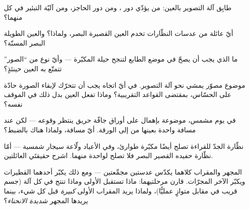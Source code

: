 \begin{exercise}[$\star$]\label{exo:g8:lenses-images:6}
طابِق آلة التصوير بالعين: من يؤدّي دور ، ومن دور
الحاجز، ومن آليّة التبئير في كل منهما؟
\end{exercise}

\begin{exercise}[$\star$]\label{exo:g8:lenses-images:7}
أيّ عائلة من عدسات النظّارات تخدم العين القصيرة البصر، ولماذا؟
والعين الطويلة البصر المسنّة؟
\end{exercise}

\begin{exercise}[$\star$]\label{exo:g8:lenses-images:8}
ما الذي يجب أن يصحّ في موضع الطابع لتنجح حيلة المكبّرة ---
وأيّ نوع من ``الصور'' تتمتّع به العين حينئذٍ؟
\end{exercise}

\begin{exercise}[$\star\star$]\label{exo:g8:lenses-images:9}
موضوع مصوّر يمشي نحو آلة التصوير. في أيّ اتجاه يجب أن تتحرّك
 لإبقاء الصورة حادّة على الحسّاس، بمقتضى القواعد
التقريبية؟ وماذا تفعل العين بدل ذلك في الموقف نفسه؟
\end{exercise}

\begin{exercise}[$\star\star$]\label{exo:g8:lenses-images:10}
في يوم مشمس،  موضوعة بإهمال على أوراق جافّة حريق ينتظر
وقوعه --- لكن عند مسافة واحدة بعينها من  إلى الورقة.
أيّ مسافة، ولماذا هناك بالضبط؟
\end{exercise}

\begin{exercise}[$\star\star$]\label{exo:g8:lenses-images:11}
نظّارة الجدّ للقراءة تصلح أيضًا مكبّرة طوارئ، وفي الأعياد
ولّاعة سيجار شمسية --- أمّا نظّارة حفيده القصير البصر فلا تصلح
لواحدة منهما. اشرح حقيقتَي العائلتين.
\end{exercise}

\begin{exercise}[$\star\star\star$]\label{exo:g8:lenses-images:12}
المجهر والمقراب كلاهما يكدّس عدستين مجمِّعتين --- ومع ذلك
يكبّر أحدهما القطيرات ويكبّر الآخر المجرّات. قارن مرحلتيهما:
ماذا تستقبل  الأولى وماذا تنتج في كل آلة (جسم قريب في
مقابل   متوازٍ عمليًّا)، ولماذا يريد المقراب 
الأولى \emph{كبيرة} قبل كل شيء، بينما يريدها المجهر
\emph{شديدة الانحناء}؟
\end{exercise}

